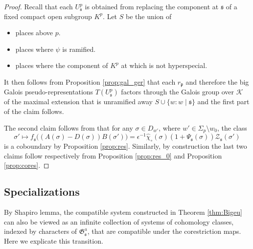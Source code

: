 \documentclass[leqno]{amsart}
\theoremstyle{definition}
\theoremstyle{remark}
\newcommand{\fp}{\mathfrak{p}}
\newcommand{\fs}{\mathfrak{s}}
\newcommand{\K}{{\mathcal{K}}} %
\newcommand{\fG}{\mathfrak{G}}
\begin{document}
\begin{proof}
Recall that each $U^p_\fs$ is obtained 
from replacing the component at $\fs$
of a fixed compact open subgroup $K^p$.
Let $S$ be the union of 
\begin{itemize}
    \item places above $p$.
    \item places where $\psi$ is ramified.
    \item places where the component of $K^p$ at which
    is not hyperspecial.
\end{itemize}
It then follows from Proposition \ref{prop:gal_ger}
that each $r_\fp$ and therefore the big Galois pseudo-representations
$T(U^p_\fs)$ factors through the Galois group over $\K$
of the maximal extension that is unramified away 
$S\cup \{w\colon w\mid \fs\}$ and the first part of the claim follows.

The second claim follows from that for any $\sigma\in D_{w'}$, 
where $w'\in\Sigma_p\setminus w_0$, the class 
\[
   \sigma'\mapsto 
   f_\fs\big((A(\sigma)-D(\sigma))B(\sigma')\big)=
   \epsilon^{-1}\hat{\chi}_\circ(\sigma)
   (1+\Psi_\fs(\sigma))\mathcal{Z}_\fs(\sigma')
\]
is a coboundary by Proposition \ref{prop:res}.
Similarly, by construction
the last two claims follow respectively from
Proposition \ref{prop:res_0} and
Proposition \ref{prop:cores}.
\end{proof}

\subsection{Specializations}

By Shapiro lemma, the compatible system constructed in 
Theorem \ref{thm:Bigeu}
can also be viewed as an infinite collection of systems
of cohomology classes,
indexed by characters of $\fG_\fs^a$,
that are compatible under the corestriction maps.
Here we explicate this transition.
\end{document}

